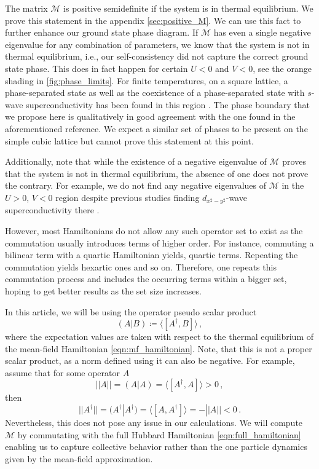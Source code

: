 \documentclass[
    reprint, 
    aps,
    preprintnumbers,
    twocolumn,
    prb,
    superscriptaddress
]{revtex4-2}
\newcommand{\mM}{\mathcal{M}}
\begin{document}
The matrix $\mM$ is positive semidefinite if the system is in thermal equilibrium.
We prove this statement in the appendix \autoref{sec:positive_M}.
We can use this fact to further enhance our ground state phase diagram.
If $\mM$ has even a single negative eigenvalue for any combination of parameters, we know that the system is not in thermal equilibrium, 
i.e., our self-consistency did not capture the correct ground state phase.
This does in fact happen for certain $U<0$ and $V<0$, see the orange shading in \autoref{fig:phase_limits}.
For finite temperatures, on a square lattice, a phase-separated state as well as the coexistence of a phase-separated state with $s$-wave superconductivity has been found in this region \cite{Linner23}.
The phase boundary that we propose here is qualitatively in good agreement with the one found in the aforementioned reference.
We expect a similar set of phases to be present on the simple cubic lattice but cannot prove this statement at this point.

Additionally, note that while the existence of a negative eigenvalue of $\mM$ proves that the system is not in thermal equilibrium, the absence of one does not prove the contrary.
For example, we do not find any negative eigenvalues of $\mM$ in the $U>0$, $V<0$ region despite previous studies finding $d_{x^2 - y^2}$-wave superconductivity there \cite{Micnas88b,Huang13}.

However, most Hamiltonians do not allow any such operator set to exist as the commutation usually introduces terms of higher order.
For instance, commuting a bilinear term with a quartic Hamiltonian yields, quartic terms. Repeating the commutation yields hexartic ones and so on.
Therefore, one repeats this commutation process and includes the occurring terms within a bigger set,
hoping to get better results as the set size increases.

In this article, we will be using the operator pseudo scalar product
\begin{equation}
\label{eqn:scalar_product}
    (A | B) \coloneqq  \langle [A^\dagger, B] \rangle\,,
\end{equation}
where the expectation values are taken with respect to the thermal equilibrium of the mean-field Hamiltonian \eqref{eqn:mf_hamiltonian}.
Note, that this is not a proper scalar product, as a norm defined using it can also be negative.
For example, assume that for some operator $A$
\begin{equation}
    ||A|| = (A | A) = \langle [A^\dagger, A] \rangle > 0\,,
\end{equation}
then
\begin{equation}
    ||A^\dagger|| = (A^\dagger | A^\dagger) = \langle [A, A^\dagger] \rangle = - ||A|| < 0\,.
\end{equation}
Nevertheless, this does not pose any issue in our calculations.
We will compute $\mM$ by commutating with the full Hubbard Hamiltonian \eqref{eqn:full_hamiltonian} enabling us to capture collective behavior rather than the one particle dynamics given by the mean-field approximation.
\end{document}
